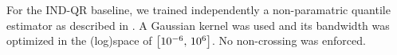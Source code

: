 For the IND-\ac{QR} baseline, we trained independently a non-paramatric
quantile estimator as described in \citet{takeuchi2006nonparametric}. A
Gaussian kernel was used and its bandwidth was optimized in the (log)space of
$\left[10^{-6},\,10^6\right]$. No non-crossing was enforced. \par
%
